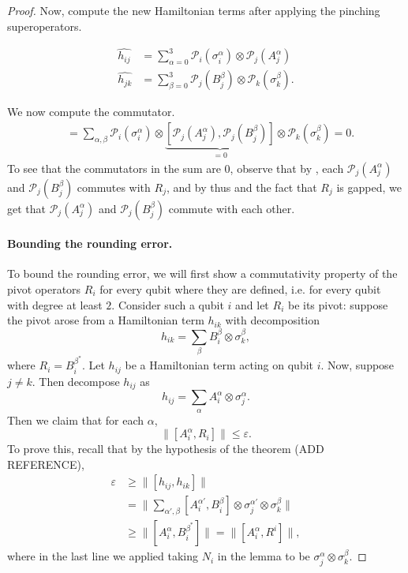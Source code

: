 \documentclass[11pt]{article}
\theoremstyle{plain}
\newcommand{\eps}{\varepsilon}
\renewcommand{\cP}{\mathcal{P}}
\begin{document}
\begin{proof}
Now, compute the new Hamiltonian terms after applying the pinching superoperators.

\begin{align}
    \widehat{h_{ij}} &= \sum_{\alpha=0}^{3} \cP_i(\sigma^{\alpha}_i) \otimes \cP_j(A^{\alpha}_j) \\
    \widehat{h_{jk}} &= \sum_{\beta =0}^{3} \cP_j(B^{\beta}_j) \otimes \cP_k(\sigma^{\beta}_k).
\end{align}

We now compute the commutator.
\begin{align}
    [\widehat{h_{ij}}, \widehat{h_{jk}}] &= \sum_{\alpha,\beta} \cP_i(\sigma_i^\alpha) \otimes \underbrace{[ \cP_j(A_j^\alpha), \cP_j(B_j^\beta)]}_{=0} \otimes \cP_k(\sigma_k^\beta) = 0.
\end{align}
To see that the commutators in the sum are $0$, observe that by , each $\cP_j(A_j^\alpha)$ and $\cP_j(B_j^\beta)$ commutes with $R_j$, and by thus  and the fact that $R_j$ is gapped, we get that $\cP_j(A_j^\alpha)$ and $\cP_j(B_j^\beta)$ commute with each other. 

\paragraph{Bounding the rounding error.}

To bound the rounding error, we will first show a commutativity property of the pivot operators $R_i$ for every qubit where they are defined, i.e. for every qubit with degree at least $2$. Consider such a qubit $i$ and let $R_i$ be its pivot: suppose the pivot arose from a Hamiltonian term $h_{ik}$ with decomposition
\begin{equation}
    h_{ik} = \sum_\beta B_i^\beta \otimes \sigma_k^\beta,
\end{equation}
where $R_i = B_i^{\beta^*}$. Let $h_{ij}$ be a Hamiltonian term acting on qubit $i$. Now, suppose $j \neq k$. Then decompose $h_{ij}$ as
\begin{equation}
    h_{ij}  = \sum_\alpha A_i^\alpha \otimes \sigma_j^\alpha. 
\end{equation}
Then we claim that for each $\alpha$,
\begin{equation}
 \| [A_i^\alpha, R_i] \| \leq \eps. \label{eq:pivot-commutes-different-term}
\end{equation}
To prove this, recall that by the hypothesis of the theorem (ADD REFERENCE), 
\begin{align}
    \eps &\geq \| [ h_{ij}, h_{ik}] \| \\
    &= \| \sum_{\alpha', \beta} [A_i^{\alpha'}, B_i^\beta] \otimes \sigma_j^{\alpha'} \otimes \sigma_k^\beta \| \\
    &\geq \| [A_i^\alpha, B_i^{\beta^*}]\| = \| [A_i^\alpha, R^i] \|,
\end{align}
where in the last line we applied  taking $N_i$ in the lemma to be $\sigma_j^\alpha \otimes \sigma_k^\beta$. 


\end{proof}
\end{document}

